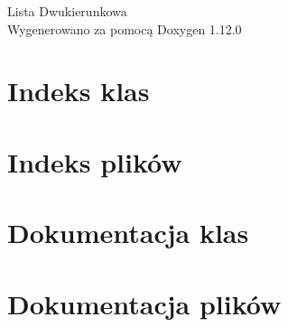 \documentclass[twoside]{book}
\newcommand{\+}{\discretionary{\mbox{\scriptsize$\hookleftarrow$}}{}{}}
\newcommand{\clearemptydoublepage}{%
    \newpage{\pagestyle{empty}\cleardoublepage}%
  }
\begin{document}
  \raggedbottom
    \hypersetup{pageanchor=false,
                bookmarksnumbered=true,
                pdfencoding=unicode
               }
  \begin{titlepage}
  \vspace*{7cm}
  \begin{center}%
  {\Large Lista Dwukierunkowa}\\
  \vspace*{1cm}
  {\large Wygenerowano za pomocą Doxygen 1.12.0}\\
  \end{center}
  \end{titlepage}
  \clearemptydoublepage
  \tableofcontents
  \clearemptydoublepage
  \hypersetup{pageanchor=true}
\chapter{Indeks klas}

\chapter{Indeks plików}

\chapter{Dokumentacja klas}


\chapter{Dokumentacja plików}


  \backmatter
  \newpage
  \clearemptydoublepage
  \printindex
\end{document}
